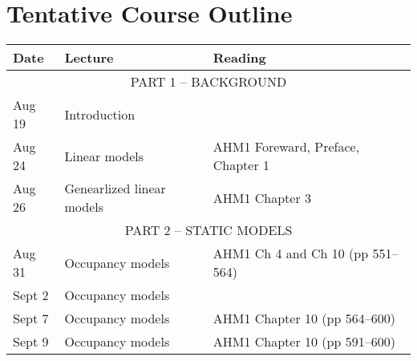 \documentclass[12pt]{article}
\begin{document}

\clearpage

\section*{\normalsize Tentative Course Outline}
\vspace{-6mm}

\begin{center}
\begin{tabular}[c]{lll}
\hline \hline
{\bf Date} & {\bf Lecture}                                & {\bf Reading}                                        \\
\hline
           \multicolumn{3}{c}{PART 1 -- BACKGROUND}                                                              \\
\hline
Aug 19     & Introduction                                 &                                                      \\
\hline
Aug 24     & Linear models                                & AHM1 Foreward, Preface, Chapter 1                    \\
Aug 26     & Genearlized linear models                    & AHM1 Chapter 3                                    \\
\hline
           \multicolumn{3}{c}{PART 2 -- STATIC MODELS}                                                           \\
\hline
Aug 31     & Occupancy models                             & AHM1 Ch 4 and Ch 10 (pp 551--564)                    \\
Sept 2     & Occupancy models                             &                                                      \\
\hline
Sept 7     & Occupancy models                             & AHM1 Chapter 10 (pp 564--600)                        \\
Sept 9     & Occupancy models                             & AHM1 Chapter 10 (pp 591--600)                        \\

\end{tabular}
\end{center}
\end{document}

